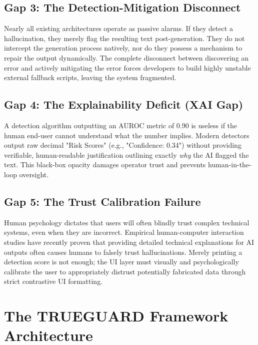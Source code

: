 \documentclass{article}
\begin{document}
\subsection{Gap 3: The Detection-Mitigation Disconnect}
Nearly all existing architectures operate as passive alarms. If they detect a hallucination, they merely flag the resulting text post-generation. They do not intercept the generation process natively, nor do they possess a mechanism to repair the output dynamically. The complete disconnect between discovering an error and actively mitigating the error forces developers to build highly unstable external fallback scripts, leaving the system fragmented.

\subsection{Gap 4: The Explainability Deficit (XAI Gap)}
A detection algorithm outputting an AUROC metric of 0.90 is useless if the human end-user cannot understand what the number implies. Modern detectors output raw decimal "Risk Scores" (e.g., "Confidence: 0.34") without providing verifiable, human-readable justification outlining exactly \textit{why} the AI flagged the text. This black-box opacity damages operator trust and prevents human-in-the-loop oversight.

\subsection{Gap 5: The Trust Calibration Failure}
Human psychology dictates that users will often blindly trust complex technical systems, even when they are incorrect. Empirical human-computer interaction studies have recently proven that providing detailed technical explanations for AI outputs often causes humans to falsely trust hallucinations. Merely printing a detection score is not enough; the UI layer must visually and psychologically calibrate the user to appropriately distrust potentially fabricated data through strict contrastive UI formatting.

\section{The TRUEGUARD Framework Architecture}
\label{sec:trueguard}
\end{document}
